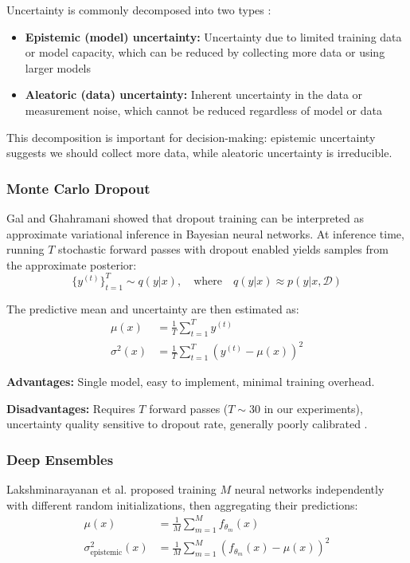 Uncertainty is commonly decomposed into two types \cite{kendall2017uncertainties,der2009aleatory}:
\begin{itemize}
    \item \textbf{Epistemic (model) uncertainty:} Uncertainty due to limited training data or model capacity, which can be reduced by collecting more data or using larger models
    \item \textbf{Aleatoric (data) uncertainty:} Inherent uncertainty in the data or measurement noise, which cannot be reduced regardless of model or data
\end{itemize}

This decomposition is important for decision-making: epistemic uncertainty suggests we should collect more data, while aleatoric uncertainty is irreducible.

\subsubsection{Monte Carlo Dropout}

Gal and Ghahramani \cite{gal2016dropout} showed that dropout training can be interpreted as approximate variational inference in Bayesian neural networks. At inference time, running $T$ stochastic forward passes with dropout enabled yields samples from the approximate posterior:
\begin{equation}
    \{y^{(t)}\}_{t=1}^T \sim q(y|x), \quad \text{where} \quad q(y|x) \approx p(y|x,\mathcal{D})
\end{equation}

The predictive mean and uncertainty are then estimated as:
\begin{align}
    \mu(x) &= \frac{1}{T} \sum_{t=1}^T y^{(t)} \\
    \sigma^2(x) &= \frac{1}{T} \sum_{t=1}^T (y^{(t)} - \mu(x))^2
\end{align}

\textbf{Advantages:} Single model, easy to implement, minimal training overhead.

\textbf{Disadvantages:} Requires $T$ forward passes ($T \sim 30$ in our experiments), uncertainty quality sensitive to dropout rate, generally poorly calibrated \cite{ovadia2019can}.

\subsubsection{Deep Ensembles}

Lakshminarayanan et al. \cite{lakshminarayanan2017simple} proposed training $M$ neural networks independently with different random initializations, then aggregating their predictions:
\begin{align}
    \mu(x) &= \frac{1}{M} \sum_{m=1}^M f_{\theta_m}(x) \\
    \sigma^2_{\text{epistemic}}(x) &= \frac{1}{M} \sum_{m=1}^M (f_{\theta_m}(x) - \mu(x))^2
\end{align}

